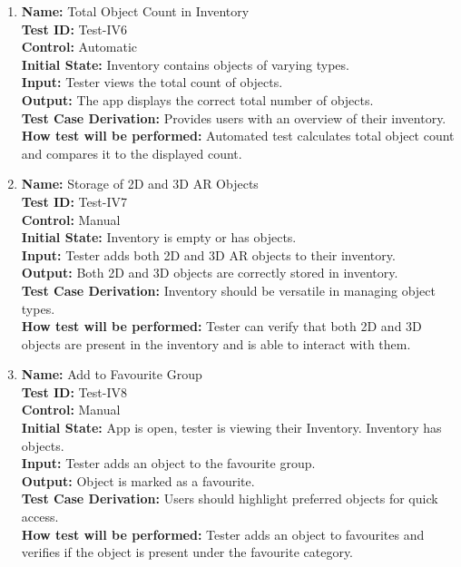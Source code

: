 \documentclass[12pt, titlepage]{article}
\begin{document}
\begin{enumerate}
  \item \textbf{Name:} Total Object Count in Inventory \label{itm:Test-IV6} \\
  \textbf{Test ID:} Test-IV6 \\
  \textbf{Control:} Automatic \\
  \textbf{Initial State:} Inventory contains objects of varying types. \\
  \textbf{Input:} Tester views the total count of objects. \\
  \textbf{Output:} The app displays the correct total number of objects. \\
  \textbf{Test Case Derivation:} Provides users with an overview of their inventory. \\
  \textbf{How test will be performed:} Automated test calculates total object count and compares it to the displayed count. \\

  \item \textbf{Name:} Storage of 2D and 3D AR Objects \label{itm:Test-IV7} \\
  \textbf{Test ID:} Test-IV7 \\
  \textbf{Control:} Manual \\
  \textbf{Initial State:} Inventory is empty or has objects. \\
  \textbf{Input:} Tester adds both 2D and 3D AR objects to their inventory. \\
  \textbf{Output:} Both 2D and 3D objects are correctly stored in inventory. \\
  \textbf{Test Case Derivation:} Inventory should be versatile in managing object types. \\
  \textbf{How test will be performed:} Tester can verify that both 2D and 3D objects are present in the inventory and is able to interact with them. \\

  \item \textbf{Name:} Add to Favourite Group \label{itm:Test-IV8} \\
  \textbf{Test ID:} Test-IV8 \\
  \textbf{Control:} Manual \\
  \textbf{Initial State:} App is open, tester is viewing their Inventory. Inventory has objects. \\
  \textbf{Input:} Tester adds an object to the favourite group. \\
  \textbf{Output:} Object is marked as a favourite. \\
  \textbf{Test Case Derivation:} Users should highlight preferred objects for quick access. \\
  \textbf{How test will be performed:} Tester adds an object to favourites and verifies if the object is present under the favourite category. \\


\end{enumerate}
\end{document}
